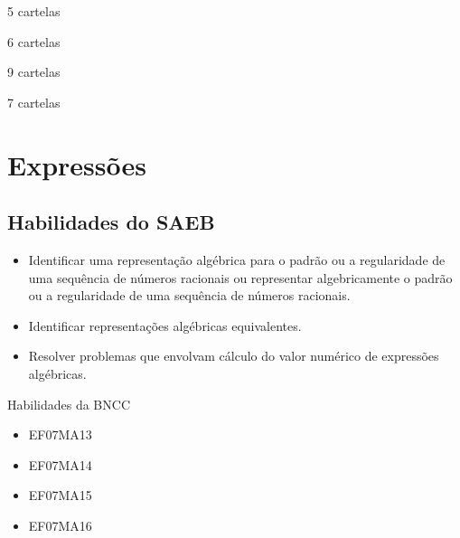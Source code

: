 \begin{escolha}
\item 5 cartelas
\item 6 cartelas
\item 9 cartelas
\item 7 cartelas
\end{escolha}



\chapter{Expressões}

\section{Habilidades do SAEB }
\begin{itemize}
\item Identificar uma representação algébrica para o
padrão ou a regularidade de uma sequência de números racionais ou
representar algebricamente o padrão ou a regularidade de uma sequência
de números racionais.
\item
  Identificar representações algébricas equivalentes.
\item
  Resolver problemas que envolvam cálculo do valor numérico de
  expressões algébricas.
\end{itemize}

Habilidades da BNCC 
\begin{itemize}
  \item EF07MA13
  \item EF07MA14
  \item EF07MA15
  \item EF07MA16
\end{itemize}

